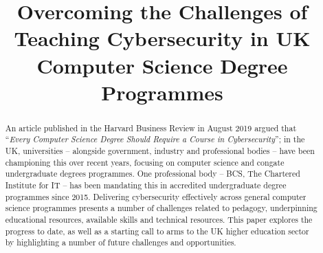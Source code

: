 \documentclass[sigconf]{acmart}
\begin{document}
\title{Overcoming the Challenges of Teaching Cybersecurity in UK Computer Science
Degree Programmes}



\begin{comment}

\author{Tom Crick}
\affiliation{%
  \institution{Swansea University}
  \city{Swansea}
  \country{UK}
}
\email{thomas.crick@swansea.ac.uk}


\author{James H. Davenport}
\affiliation{%
  \institution{ University of Bath}
  \city{Bath}
  \country{UK}
}
\email{j.h.davenport@bath.ac.uk}

\author{Alastair Irons}
\affiliation{%
  \institution{ Sunderland University}
  \city{Sunderland}
  \country{UK}
}
\email{alastair.irons@sunderland.ac.uk}

\author{Tom Prickett}
\affiliation{%
  \institution{ Northumbria University}
  \city{Newcastle upon Tyne}
  \country{UK}
}
\email{tom.prickett@northumbria.ac.uk}
\end{comment}


\renewcommand{\shortauthors}{Crick, Davenport,  Irons, and Prickett.}
\begin{abstract}
  An article published in the Harvard Business Review in August 2019
argued that ``{\emph{Every Computer Science Degree Should Require a
Course in Cybersecurity}}''\cite{cable_2019}; in the UK, universities
-- alongside government, industry and professional bodies -- have been
championing this over recent years, focusing on computer science and
congate undergraduate degrees programmes. One professional body --
BCS, The Chartered Institute for IT -- has been mandating this in
accredited undergraduate degree programmes since
2015\cite{Cricketal2019}. Delivering cybersecurity effectively across
general computer science programmes presents a number of challenges
related to pedagogy, underpinning educational resources, available
skills and technical resources. This paper explores the progress to
date, as well as a starting call to arms to the UK higher education sector by
highlighting a number of future challenges and opportunities.
\end{abstract}
\end{document}
